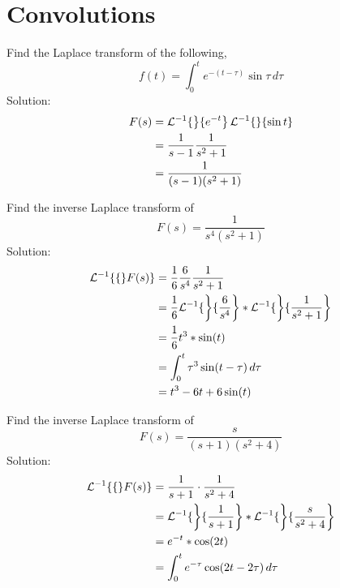 \documentclass[diffeq.tex]{subfiles}
\begin{document}
\section{Convolutions}
\begin{homework*}[278.5]
    Find the Laplace transform of the following,
    \begin{equation}
        f(t) = \int_{0}^{t}e^{-(t-\tau)}\sin\tau\,d\tau
    \end{equation}
    Solution:
    \begin{alignat}{1}
        F(s) &= \mathcal{L}^{-1}\{\left\}\{e^{-t}\right\}\mathcal{L}^{-1}\{\left\}\{\sin t\right\}\\
        &= \frac{1}{s - 1}\frac{1}{s^{2} + 1}\\
        &= \frac{1}{(s - 1)(s^{2} + 1)}
    \end{alignat}
\end{homework*}
\begin{homework*}[278.7]
    Find the inverse Laplace transform of
    \begin{equation}
        F(s) = \frac{1}{s^{4}(s^{2} + 1)}
    \end{equation}
    Solution:
    \begin{alignat}{1}
        \mathcal{L}^{-1}\{\{\}F(s)\} &= \frac{1}{6}\frac{6}{s^{4}}\frac{1}{s^{2} + 1}\\
        &= \frac{1}{6}\mathcal{L}^{-1}\{\left\}\{\frac{6}{s^{4}}\right\}*\mathcal{L}^{-1}\{\left\}\{\frac{1}{s^{2} + 1}\right\}\\
        &= \frac{1}{6}t^{3}*\sin(t)\\
        &= \int_{0}^{t}\tau^{3}\sin(t - \tau)\,d\tau\\
        &= t^{3} - 6t + 6\sin(t)
    \end{alignat}
\end{homework*}
\np
\begin{homework*}[278.8]
    Find the inverse Laplace transform of
    \begin{equation}
        F(s) = \frac{s}{(s + 1)(s^{2} + 4)}
    \end{equation}
    Solution:
    \begin{alignat}{1}
        \mathcal{L}^{-1}\{\{\}F(s)\} &= \frac{1}{s + 1}\cdot\frac{1}{s^{2} + 4}\\
        &= \mathcal{L}^{-1}\{\left\}\{\frac{1}{s + 1}\right\}*\mathcal{L}^{-1}\{\left\}\{\frac{s}{s^{2} + 4}\right\}\\
        &= e^{-t}*\cos(2t)\\
        &= \int_{0}^{t}e^{-\tau}\cos(2t-2\tau)\,d\tau
    \end{alignat}
\end{homework*}
\end{document}
